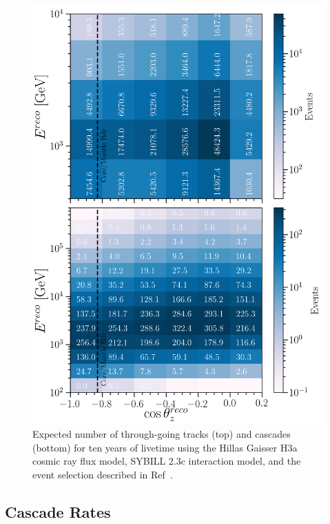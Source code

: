 \documentclass[main.tex]{subfiles}
\begin{document}
\begin{figure}
    \centering
    \includegraphics[width=0.95\linewidth]{figures/event_rate.png}
    \caption{Expected number of through-going tracks (top) and cascades (bottom) for ten years of livetime using the Hillas Gaisser H3a cosmic ray flux model, SYBILL 2.3c interaction model, and the event selection described in Ref~\cite{2018PhDT17N}.}\label{fig:eventrate}
\end{figure}

\subsection{\label{sub:cascade} Cascade Rates}
\end{document}
